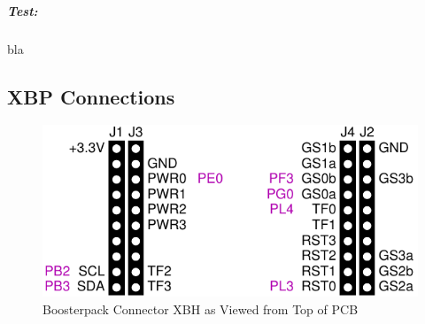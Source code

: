 \documentclass[twoside,11pt]{cergdoc}
\begin{document}
\paragraph{Test:} bla 

\begin{appendix}
\chapter{XBP Connections}

\begin{figure}[ht]
  \begin{center}
    \includegraphics[scale=1]{figures/xbp-xbh}
    \caption{Boosterpack Connector XBH as Viewed from Top of PCB}
  \end{center}
\end{figure}


\end{appendix}
\end{document}
